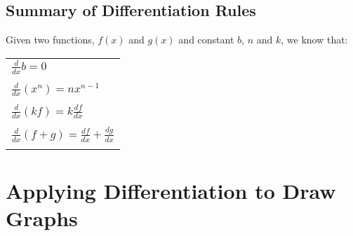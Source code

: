 \subsection{Summary of Differentiation Rules}
\label{md:summ}

Given two functions, $f(x)$ and $g(x)$ and constant $b$, $n$ and $k$, we know that:
\begin{center}
\begin{tabular}{l}
$\frac{d}{dx} b = 0$\\
\\
$\frac{d}{dx} (x^n) = nx^{n-1}$\\
\\
$\frac{d}{dx} (kf) = k\frac{df}{dx}$\\
\\
$\frac{d}{dx} (f+g)= \frac{df}{dx}+\frac{dg}{dx}$\\
\\
\end{tabular}
\end{center}


\section{Applying Differentiation to Draw Graphs}
\label{md:graphs}

